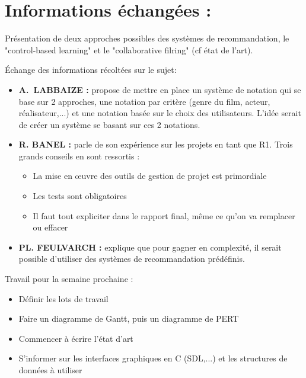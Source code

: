 \documentclass[11pt]{meetingmins}
\begin{document}
\section{Informations échangées :}
\begin{hiddenitems}
\item
Présentation de deux approches possibles des systèmes de recommandation, le "control-based learning" et le "collaborative filring" (cf état de l'art).
\item
Échange des informations récoltées sur le sujet:
\begin{itemize}
    \item \textbf{A.~LABBAIZE : }propose de mettre en place un système de notation qui se base sur 2 approches, une notation par critère (genre du film, acteur, réalisateur,...) et une notation basée sur le choix des utilisateurs. L'idée serait de créer un système se basant sur ces 2 notations.
    
    

    \item \textbf{R. BANEL : }parle de son expérience sur les projets en tant que R1. Trois grands conseils en sont ressortis :
    \begin{itemize}
        \item La mise en œuvre des outils de gestion de projet est primordiale
        \item Les tests sont obligatoires
        \item Il faut tout expliciter dans le rapport final, même ce qu'on va remplacer ou effacer
    \end{itemize}
    
    
    \item \textbf{PL. FEULVARCH : }explique que pour gagner en complexité, il serait possible d'utiliser des systèmes de recommandation prédéfinis.
    
\end{itemize}


\item Travail pour la semaine prochaine : 
\begin{itemize}
    \item Définir les lots de travail 
    \item Faire un diagramme de Gantt, puis un diagramme de PERT
    \item Commencer à écrire l'état d'art
    \item S'informer sur les interfaces graphiques en C (SDL,...) et les structures de données à utiliser
\end{itemize}


\end{hiddenitems}
\end{document}
